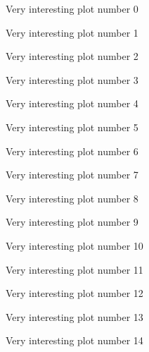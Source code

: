 
\begin{figure}

\caption{Very interesting plot number 0}
\end{figure}
\begin{figure}

\caption{Very interesting plot number 1}
\end{figure}
\begin{figure}

\caption{Very interesting plot number 2}
\end{figure}
\begin{figure}

\caption{Very interesting plot number 3}
\end{figure}
\begin{figure}

\caption{Very interesting plot number 4}
\end{figure}
\begin{figure}

\caption{Very interesting plot number 5}
\end{figure}
\begin{figure}

\caption{Very interesting plot number 6}
\end{figure}
\begin{figure}

\caption{Very interesting plot number 7}
\end{figure}
\begin{figure}

\caption{Very interesting plot number 8}
\end{figure}
\begin{figure}

\caption{Very interesting plot number 9}
\end{figure}
\begin{figure}

\caption{Very interesting plot number 10}
\end{figure}
\begin{figure}

\caption{Very interesting plot number 11}
\end{figure}
\begin{figure}

\caption{Very interesting plot number 12}
\end{figure}
\begin{figure}

\caption{Very interesting plot number 13}
\end{figure}
\begin{figure}

\caption{Very interesting plot number 14}
\end{figure}
